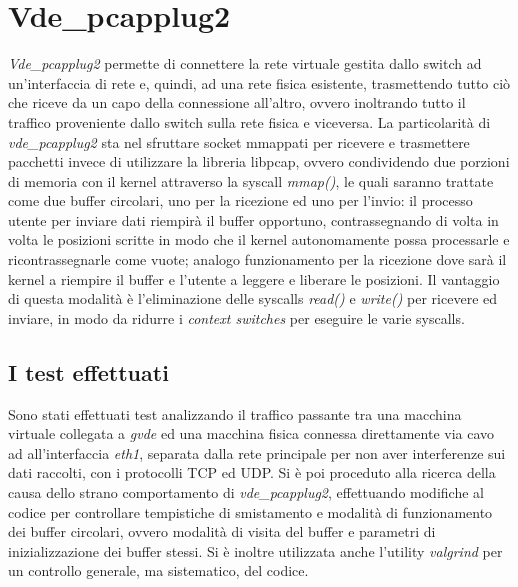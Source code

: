 \section{Vde\_pcapplug2}
{\em Vde\_pcapplug2} permette di connettere la rete virtuale gestita dallo switch ad un'interfaccia di rete e, quindi, ad una rete fisica esistente, trasmettendo tutto ciò che riceve da un capo della connessione all'altro, ovvero inoltrando tutto il traffico proveniente dallo switch sulla rete fisica e viceversa.
La particolarità di {\em vde\_pcapplug2} sta nel sfruttare socket mmappati per ricevere e trasmettere pacchetti invece di utilizzare la libreria libpcap, ovvero condividendo due porzioni di memoria con il kernel attraverso la syscall {\em mmap()}, le quali saranno trattate come due buffer circolari, uno per la ricezione ed uno per l'invio: il processo utente per inviare dati riempirà il buffer opportuno, contrassegnando di volta in volta le posizioni scritte in modo che il kernel autonomamente possa processarle e ricontrassegnarle come vuote; analogo funzionamento per la ricezione dove sarà il kernel a riempire il buffer e l'utente a leggere e liberare le posizioni. Il vantaggio di questa modalità è l'eliminazione delle syscalls {\em read()} e {\em write()} per ricevere ed inviare, in modo da ridurre i {\em context switches} per eseguire le varie syscalls.
\subsection{I test effettuati}
Sono stati effettuati test analizzando il traffico passante tra una macchina virtuale collegata a {\em gvde} ed una macchina fisica connessa direttamente via cavo ad all'interfaccia {\em eth1}, separata dalla rete principale per non aver interferenze sui dati raccolti, con i protocolli TCP ed UDP. Si è poi proceduto alla ricerca della causa dello strano comportamento di {\em vde\_pcapplug2}, effettuando modifiche al codice per controllare tempistiche di smistamento e modalità di funzionamento dei buffer circolari, ovvero modalità di visita del buffer e parametri di inizializzazione dei buffer stessi. Si è inoltre utilizzata anche l'utility {\em valgrind} per un controllo generale, ma sistematico, del codice.
